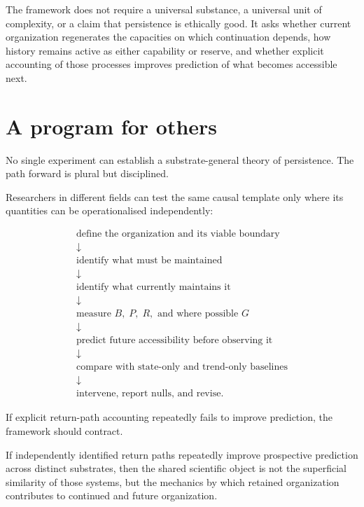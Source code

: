 \documentclass[11pt,a4paper]{article}
\begin{document}
The framework does not require a universal substance, a universal unit of complexity, or a claim that persistence is ethically good. It asks whether current organization regenerates the capacities on which continuation depends, how history remains active as either capability or reserve, and whether explicit accounting of those processes improves prediction of what becomes accessible next.

\section{A program for others}

No single experiment can establish a substrate-general theory of persistence. The path forward is plural but disciplined.

Researchers in different fields can test the same causal template only where its quantities can be operationalised independently:

\begin{equation}
\boxed{
\begin{gathered}
\text{define the organization and its viable boundary}\\
\downarrow\\
\text{identify what must be maintained}\\
\downarrow\\
\text{identify what currently maintains it}\\
\downarrow\\
\text{measure }B,\;P,\;R,\text{ and where possible }G\\
\downarrow\\
\text{predict future accessibility before observing it}\\
\downarrow\\
\text{compare with state-only and trend-only baselines}\\
\downarrow\\
\text{intervene, report nulls, and revise}.
\end{gathered}
}
\label{eq:program}
\end{equation}

If explicit return-path accounting repeatedly fails to improve prediction, the framework should contract.

If independently identified return paths repeatedly improve prospective prediction across distinct substrates, then the shared scientific object is not the superficial similarity of those systems, but the mechanics by which retained organization contributes to continued and future organization.
\end{document}
